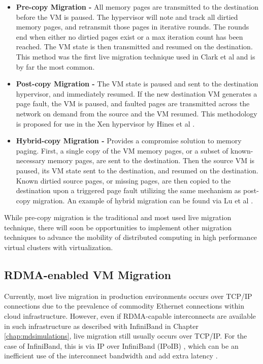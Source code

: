\begin{itemize}
\item \textbf{Pre-copy Migration - }  All memory pages are transmitted to the destination before the VM is paused. The hypervisor will note and track all dirtied memory pages, and retransmit those pages in iterative rounds. The rounds end when either no dirtied pages exist or a max iteration count has been reached. The VM state is then transmitted and resumed on the destination. This method was the first live migration technique used in Clark et al \cite{clark2005live} and is by far the most common. 
\item \textbf{Post-copy Migration - } The VM state is paused and sent to the destination hypervisor, and immediately resumed. If the new destination VM generates a page fault, the VM is paused, and faulted pages are transmitted across the network on demand from the source and the VM resumed.  This methodology is proposed for use in the Xen hypervisor by Hines et al \cite{hines2009post}. 
\item \textbf{Hybrid-copy Migration - } Provides a compromise solution to memory paging. First, a single copy of the VM memory pages, or a subset of known-necessary memory pages, are sent to the destination.  Then the source VM is paused, its VM state sent to the destination, and resumed on the destination.  Known dirtied source pages, or missing pages, are then copied to the destination upon a triggered page fault utilizing the same mechanism as post-copy migration. An example of hybrid migration can be found via Lu et al \cite{Lu2013}. 
\end{itemize}

While pre-copy migration is the traditional and most used live migration technique, there will soon be opportunities to implement other migration techniques to advance the mobility of distributed computing in high performance virtual clusters with virtualization. 



\subsection{RDMA-enabled VM Migration}

Currently, most live migration in production environments occurs over TCP/IP connections due to the prevalence of commodity Ethernet connections within cloud infrastructure. However, even if RDMA-capable interconnects are available in such infrastructure as described with InfiniBand in Chapter \ref{chap:mdsimulations}, live migration still usually occurs over TCP/IP. For the case of InfiniBand, this is via IP over InfiniBand (IPoIB) \cite{chu2006ipoib}, which can be an inefficient use of the interconnect bandwidth and add extra latency \cite{yu2008performance}. 

